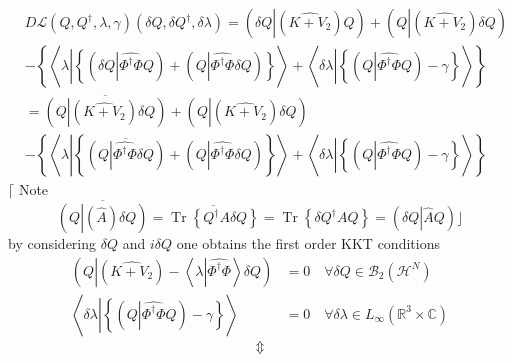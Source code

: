 \documentclass[aps,preprint]{revtex4}%
\begin{document}
\begin{align}
&  D\mathcal{L}\left(  Q,Q^{\dagger},\lambda,\gamma\right)  \left(  \delta
Q,\delta Q^{\dagger},\delta\lambda\right)  =\left(  \delta Q\left\vert \left(
\widehat{K+V_{2}}\right)  Q\right.  \right)  +\left(  Q\left\vert \left(
\widehat{K+V_{2}}\right)  \delta Q\right.  \right)  \nonumber\\
&  -\left\{  \left\langle \lambda\left\vert \left\{  \left(  \delta
Q\left\vert \widehat{\Phi^{\dagger}\Phi}Q\right.  \right)  +\left(
Q\left\vert \widehat{\Phi^{\dagger}\Phi}\delta Q\right.  \right)  \right\}
\right.  \right\rangle +\left\langle \delta\lambda\left\vert \left\{  \left(
Q\left\vert \widehat{\Phi^{\dagger}\Phi}Q\right.  \right)  -\gamma\right\}
\right.  \right\rangle \right\}  \nonumber\\
&  =\overline{\left(  Q\left\vert \left(  \widehat{K+V_{2}}\right)  \delta
Q\right.  \right)  }+\left(  Q\left\vert \left(  \widehat{K+V_{2}}\right)
\delta Q\right.  \right)  \nonumber\\
&  -\left\{  \left\langle \lambda\left\vert \left\{  \overline{\left(
Q\left\vert \widehat{\Phi^{\dagger}\Phi}\delta Q\right.  \right)  }+\left(
Q\left\vert \widehat{\Phi^{\dagger}\Phi}\delta Q\right.  \right)  \right\}
\right.  \right\rangle +\left\langle \delta\lambda\left\vert \left\{  \left(
Q\left\vert \widehat{\Phi^{\dagger}\Phi}Q\right.  \right)  -\gamma\right\}
\right.  \right\rangle \right\}
\end{align}
$\lceil$ Note
\begin{equation}
\overline{\left(  Q\left\vert \left(  \widehat{A}\right)  \delta Q\right.
\right)  }=\overline{\operatorname{Tr}\left\{  Q^{\dagger}A\delta Q\right\}
}=\operatorname{Tr}\left\{  \delta Q^{\dagger}AQ\right\}  =\left(  \delta
Q\left\vert \widehat{A}Q\right.  \right)  \rfloor
\end{equation}
by considering $\delta Q$ and $i\delta Q$ one obtains the first order KKT
conditions
\begin{subequations}
\begin{align}
\left(  Q\left\vert \left(  \widehat{K+V_{2}}\right)  -\left\langle
\lambda\left\vert \widehat{\Phi^{\dagger}\Phi}\right.  \right\rangle \right.
\delta Q\right)   &  =0\quad\forall\delta Q\in\mathcal{B}_{2}\left(
\mathcal{H}^{N}\right)  \\
\left\langle \delta\lambda\left\vert \left\{  \left(  Q\left\vert
\widehat{\Phi^{\dagger}\Phi}Q\right.  \right)  -\gamma\right\}  \right.
\right\rangle  &  =0\quad\forall\delta\lambda\in L_{\infty}\left(
\mathbb{R}^{3}\times\mathbb{C}\right)
\end{align}%
\end{subequations}
\[
\Updownarrow
\]
%
\end{document}
